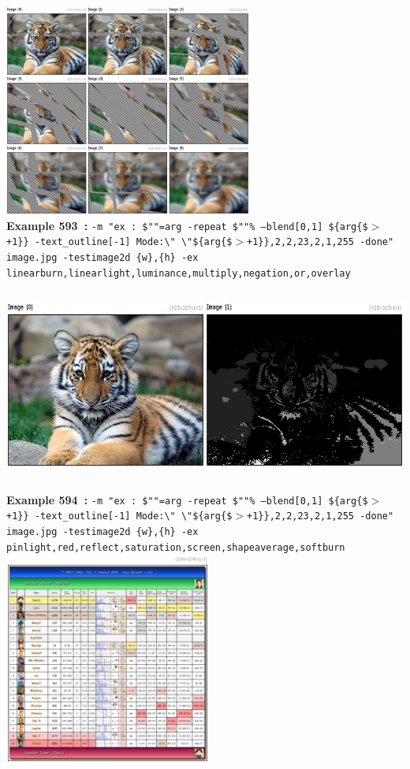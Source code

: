 \documentclass[a4paper,11pt,twoside]{book}
\begin{document}
\begin{center}
\\\includegraphics[keepaspectratio=true,height=7cm,width=\textwidth]{img/gmic_def593.jpg}\\
{\footnotesize \textbf{Example 593~:} \texttt{-m "ex : \$""=arg -repeat \$""\% --blend[0,1] \$\{arg\{\$$>$+1\}\} -text\_outline[-1] Mode:\textbackslash " \textbackslash "\$\{arg\{\$$>$+1\}\},2,2,23,2,1,255 -done" image.jpg -testimage2d \{w\},\{h\} -ex linearburn,linearlight,luminance,multiply,negation,or,overlay}}
\\\includegraphics[keepaspectratio=true,height=7cm,width=\textwidth]{img/gmic_def594.jpg}\\
{\footnotesize \textbf{Example 594~:} \texttt{-m "ex : \$""=arg -repeat \$""\% --blend[0,1] \$\{arg\{\$$>$+1\}\} -text\_outline[-1] Mode:\textbackslash " \textbackslash "\$\{arg\{\$$>$+1\}\},2,2,23,2,1,255 -done" image.jpg -testimage2d \{w\},\{h\} -ex pinlight,red,reflect,saturation,screen,shapeaverage,softburn}}
\\\includegraphics[keepaspectratio=true,height=7cm,width=\textwidth]{img/gmic_def595.jpg}\\

\end{center}
\end{document}
